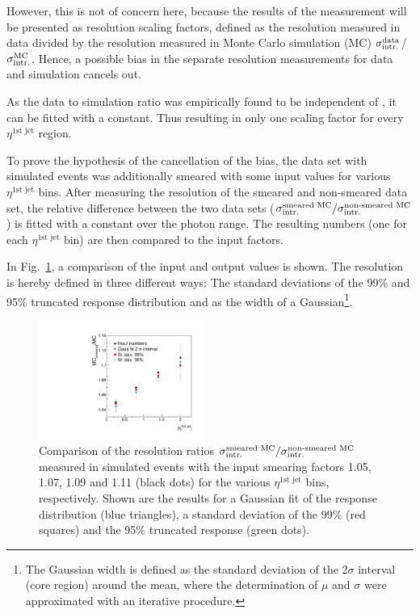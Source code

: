 However, this is not of concern here, because the results of the measurement will be presented as resolution scaling factors, defined as the resolution measured in data divided by
the resolution measured in Monte Carlo simulation (MC) $\sigma_\mathrm{intr.}^{\text{data}}$/$\sigma_\mathrm{intr.}^{\text{MC}}$. 
Hence, a possible bias in the separate resolution measurements for data and simulation cancels out. 

As the data to simulation ratio was empirically found to be independent of \ptgamma, it can be fitted with a constant.
Thus resulting in only one scaling factor for every $\eta^{\text{1st jet}}$ region.


To prove the hypothesis of the cancellation of the bias, the data set with simulated events was additionally smeared with some input values for various $\eta^{\text{1st jet}}$ bins. 
After measuring the resolution of the smeared and non-smeared data set, the relative difference between the two data sets ($\sigma_\mathrm{intr.}^{\text{smeared MC}}/\sigma_\mathrm{intr.}^{\text{non-smeared MC}}$) is fitted with a constant over the photon \pt range. 
The resulting numbers (one for each $\eta^{\text{1st jet}}$ bin) are then compared to the input factors. 

In Fig.~\ref{fig:MCClosureRatio}, a comparison of the input and output values is shown. 
The resolution is hereby defined in three different ways: The standard deviations of the 99\% and 95\% truncated response distribution and as the width of a Gaussian\footnote{The Gaussian width is defined as the standard deviation of the 2$\sigma$ interval (core region) around the mean, where the determination of $\mu$ and $\sigma$ were approximated with an iterative procedure.}.
\begin{figure}[tbp]
  \centering
    \includegraphics[width=0.49\textwidth]{figures/resolution/methodology/MCClosureRatio.pdf}
     \caption{Comparison of the resolution ratios $\sigma_\mathrm{intr.}^{\text{smeared MC}}/\sigma_\mathrm{intr.}^{\text{non-smeared MC}}$ measured in simulated events with the input smearing factors 1.05, 1.07, 1.09 and 1.11 (black dots) 
              for the various $\eta^{\text{1st jet}}$ bins, respectively. 
              Shown are the results for a Gaussian fit of the response distribution (blue triangles), a standard deviation of the 99\% (red squares) and the 95\% truncated response (green dots).}
  \label{fig:MCClosureRatio}
\end{figure}

